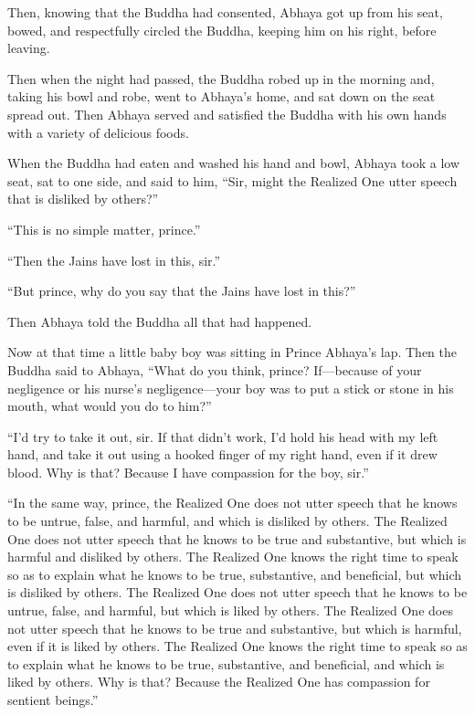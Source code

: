 \documentclass[12pt,openany]{book}%
\begin{document}
Then, knowing that the Buddha had consented, Abhaya got up from his seat, bowed, and respectfully circled the Buddha, keeping him on his right, before leaving. 

Then when the night had passed, the Buddha robed up in the morning and, taking his bowl and robe, went to Abhaya’s home, and sat down on the seat spread out. Then Abhaya served and satisfied the Buddha with his own hands with a variety of delicious foods. 

When the Buddha had eaten and washed his hand and bowl, Abhaya took a low seat, sat to one side, and said to him, “Sir, might the Realized One utter speech that is disliked by others?” 

“This is no simple matter, prince.” 

“Then the Jains have lost in this, sir.” 

“But prince, why do you say that the Jains have lost in this?” 

Then Abhaya told the Buddha all that had happened. 

Now at that time a little baby boy was sitting in Prince Abhaya’s lap. Then the Buddha said to Abhaya, “What do you think, prince? If—because of your negligence or his nurse’s negligence—your boy was to put a stick or stone in his mouth, what would you do to him?” 

“I’d try to take it out, sir. If that didn’t work, I’d hold his head with my left hand, and take it out using a hooked finger of my right hand, even if it drew blood. Why is that? Because I have compassion for the boy, sir.” 

“In the same way, prince, the Realized One does not utter speech that he knows to be untrue, false, and harmful, and which is disliked by others. The Realized One does not utter speech that he knows to be true and substantive, but which is harmful and disliked by others. The Realized One knows the right time to speak so as to explain what he knows to be true, substantive, and beneficial, but which is disliked by others. The Realized One does not utter speech that he knows to be untrue, false, and harmful, but which is liked by others. The Realized One does not utter speech that he knows to be true and substantive, but which is harmful, even if it is liked by others. The Realized One knows the right time to speak so as to explain what he knows to be true, substantive, and beneficial, and which is liked by others. Why is that? Because the Realized One has compassion for sentient beings.” 
\end{document}
